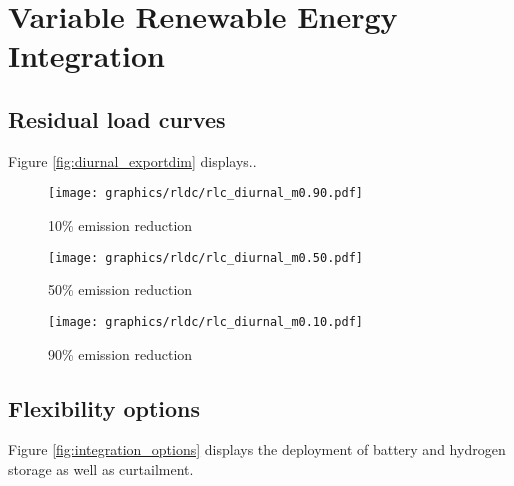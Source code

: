 
\section{Variable Renewable Energy Integration}

\subsection{Residual load curves}

Figure \ref{fig:diurnal_exportdim} displays..

\begin{figure*}[h] %
    \centering
    \begin{subfigure}[b]{0.3\linewidth}
        \centering
        \texttt{[image: graphics/rldc/rlc\_diurnal\_m0.90.pdf]}
        \caption{10\% emission reduction}
        \label{fig:diurnal_10emred}
    \end{subfigure}
    \hfill
    \begin{subfigure}[b]{0.3\linewidth}
        \centering
        \texttt{[image: graphics/rldc/rlc\_diurnal\_m0.50.pdf]}
        \caption{50\% emission reduction}
        \label{fig:diurnal_50emred}
    \end{subfigure}
    \hfill
    \begin{subfigure}[b]{0.3\linewidth}
        \centering
        \texttt{[image: graphics/rldc/rlc\_diurnal\_m0.10.pdf]}
        \caption{90\% emission reduction}
        \label{fig:diurnal_90emred}
    \end{subfigure}
    \hfill
    \caption{Export dependent (0 - 200 TWh) residual load curves with various integration options. Each row represents different integration strategies (RLC without integration, RLC with curtailment, RLC with curtailment and electrolyser load).
    Each column represents different climate ambitions (10 - 90\% emission reduction)}
    \label{fig:diurnal_exportdim}
\end{figure*}


\subsection{Flexibility options}
Figure \ref{fig:integration_options} displays the deployment of battery and hydrogen storage as well as curtailment.

